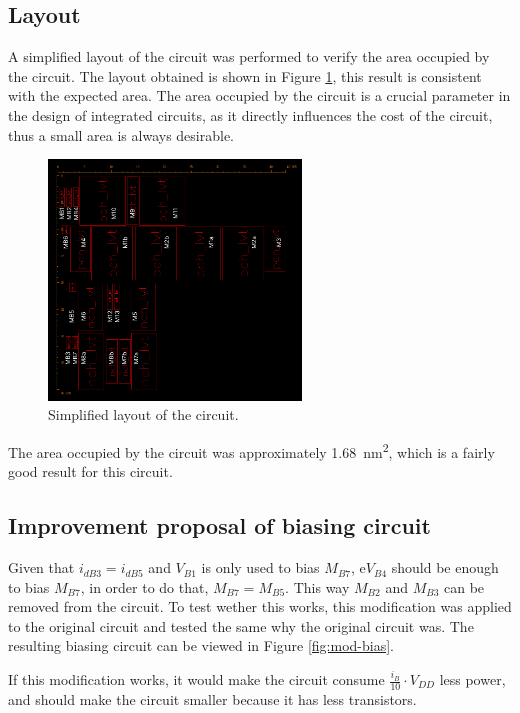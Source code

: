 \subsection{Layout}

A simplified layout of the circuit was performed to verify the area occupied by the circuit. The layout obtained is shown in Figure \ref{fig:layout}, this result is consistent with the expected area. The area occupied by the circuit is a crucial parameter in the design of integrated circuits, as it directly influences the cost of the circuit, thus a small area is always desirable.

\begin{figure}[H]
    \centering
    \includegraphics[width=0.6\textwidth]{Images/layout.png}
    \caption{Simplified layout of the circuit.}
    \label{fig:layout}
\end{figure}

The area occupied by the circuit was approximately \SI{1.68}{\nano\meter\squared}, which is a fairly good result for this circuit.

\subsection{Improvement proposal of biasing circuit}

Given that $i_{dB3} = i_{dB5}$ and $V_{B1}$ is only used to bias $M_{B7}$, e$V_{B4}$ should be enough to bias $M_{B7}$, in order to do that, $M_{B7} = M_{B5}$. This way $M_{B2}$ and $M_{B3}$ can be removed from the circuit. To test wether this works, this modification was applied to the original circuit and tested the same why the original circuit was. The resulting biasing circuit can be viewed in Figure \ref{fig:mod-bias}.

If this modification works, it would make the circuit consume $\frac{i_B}{10}\cdot V_{DD}$ less power, and should make the circuit smaller because it has less transistors.

